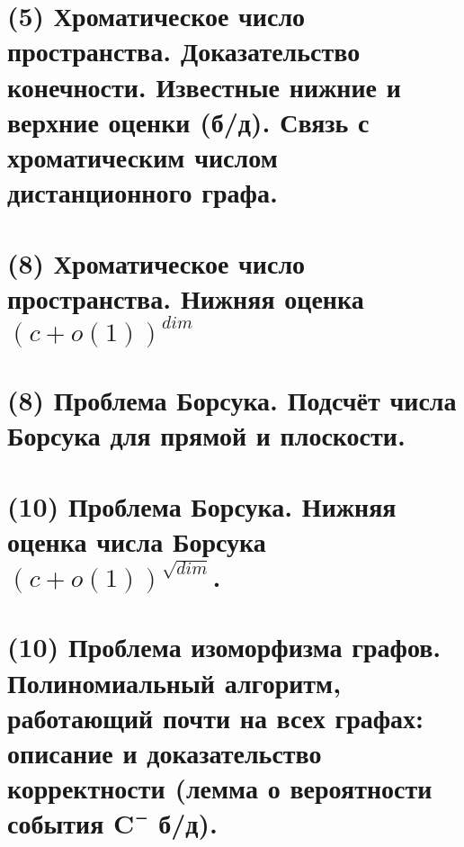 \section{(5) Хроматическое число пространства. Доказательство конечности. Известные нижние и верхние оценки (б/д). Связь с хроматическим числом дистанционного графа.}

\newpage{}

\section{(8) Хроматическое число пространства. Нижняя оценка $(c + o(1))^{dim}$}

\newpage{}

\section{(8) Проблема Борсука. Подсчёт числа Борсука для прямой и плоскости.}

\newpage{}

\section{(10) Проблема Борсука. Нижняя оценка числа Борсука \texorpdfstring{$(c + o(1))^{\sqrt{dim}}$}{(c+o(1))^sqrt(dim)}.}

\newpage{}

\section{(10) Проблема изоморфизма графов. Полиномиальный алгоритм, работающий почти на всех графах: описание и доказательство корректности (лемма о вероятности события C¯ б/д).}

\newpage{}